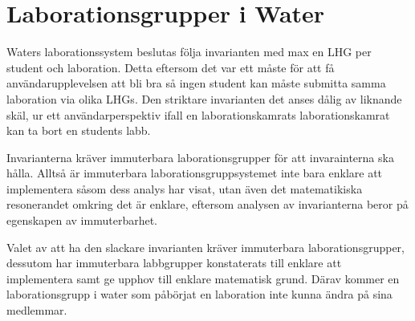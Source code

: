 \section{Laborationsgrupper i Water}

Waters laborationssystem beslutas följa invarianten med max en LHG per student
och laboration. Detta eftersom det var ett måste för att få användarupplevelsen
att bli bra så ingen student kan måste submitta samma laboration via olika
LHGs.  Den striktare invarianten det anses dålig av liknande skäl, ur ett
användarperspektiv ifall en laborationskamrats laborationskamrat kan ta bort en
students labb.

Invarianterna kräver immuterbara laborationsgrupper för att invarainterna ska
hålla. Alltså är immuterbara laborationsgruppsystemet inte bara enklare att
implementera såsom dess analys har visat, utan även det matematikiska
resonerandet omkring det är enklare, eftersom analysen av invarianterna beror
på egenskapen av immuterbarhet.

Valet av att ha den slackare invarianten kräver immuterbara laborationsgrupper,
dessutom har immuterbara labbgrupper konstaterats till enklare att implementera
samt ge upphov till enklare matematisk grund. Därav kommer en laborationsgrupp
i water som påbörjat en laboration inte kunna ändra på sina medlemmar.
